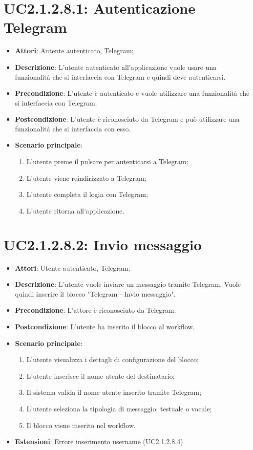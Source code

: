 \section{UC2.1.2.8.1: Autenticazione Telegram}
\label{UC2.1.2.8.1}
\begin{itemize}
	\item \textbf{Attori}: Autente autenticato, Telegram;
	\item \textbf{Descrizione}: L'utente autenticato all'applicazione vuole usare una funzionalità che si interfaccia con Telegram e quindi deve autenticarsi. 
	\item \textbf{Precondizione}: L'utente è autenticato e vuole utilizzare una funzionalità che si interfaccia con Telegram. 
	\item \textbf{Postcondizione}: L'utente è riconosciuto da Telegram e può utilizzare una funzionalità che si interfaccia con esso. 
	\item \textbf{Scenario principale}:
	\begin{enumerate} \item L'utente preme il pulsare per autenticarsi a Telegram;  \item  L'utente viene reindirizzato a Telegram;  \item  L'utente completa il login con Telegram;  \item  L'utente ritorna all'applicazione.\end{enumerate}
\end{itemize}

\section{UC2.1.2.8.2: Invio messaggio}
\label{UC2.1.2.8.2}
\begin{itemize}
	\item \textbf{Attori}: Utente autenticato, Telegram;
	\item \textbf{Descrizione}: L'utente vuole inviare un messaggio tramite Telegram. Vuole quindi inserire il blocco "Telegram - Invio messaggio".
	\item \textbf{Precondizione}: L'attore è riconosciuto da Telegram.
	\item \textbf{Postcondizione}: L'utente ha inserito il blocco al workflow.
	\item \textbf{Scenario principale}:
	\begin{enumerate} \item L'utente visualizza i dettagli di configurazione del blocco;   \item  L'utente inserisce il nome utente del destinatario;  \item  Il sistema valida il nome utente inserito tramite Telegram;  \item  L'utente seleziona la tipologia di messaggio: testuale o vocale;  \item  Il blocco viene inserito nel workflow.\end{enumerate}
	\item \textbf{Estensioni}:
	Errore inserimento username (UC2.1.2.8.4)
\end{itemize}

